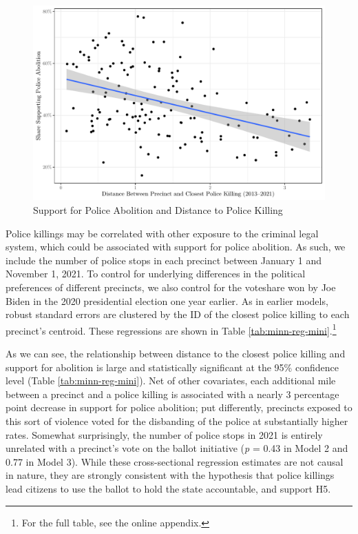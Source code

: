 \documentclass[12pt]{article}
\begin{document}
\begin{figure}[!ht]

\centering \includegraphics[width=\linewidth]{Figures/minn-scatter-1} 

\caption{\label{fig:minn-scatter}Support for Police Abolition and Distance to Police Killing}
\end{figure}

Police killings may be correlated with other exposure to the criminal legal system, which could be associated with support for police abolition. As such, we include the number of police stops in each precinct between January 1 and November 1, 2021. To control for underlying differences in the political preferences of different precincts, we also control for the voteshare won by Joe Biden in the 2020 presidential election one year earlier. As in earlier models, robust standard errors are clustered by the ID of the closest police killing to each precinct's centroid. These regressions are shown in Table \ref{tab:minn-reg-mini}.\footnote{For the full table, see the online appendix.} 



As we can see, the relationship between distance to the closest police killing and support for abolition is large and statistically significant at the 95\% confidence level (Table \ref{tab:minn-reg-mini}). Net of other covariates, each additional mile between a precinct and a police killing is associated with a nearly 3 percentage point decrease in support for police abolition; put differently, precincts exposed to this sort of violence voted for the disbanding of the police at substantially higher rates. Somewhat surprisingly, the number of police stops in 2021 is entirely unrelated with a precinct's vote on the ballot initiative (\textit{p} = 0.43 in Model 2 and 0.77 in Model 3). While these cross-sectional regression estimates are not causal in nature, they are strongly consistent with the hypothesis that police killings lead citizens to use the ballot to hold the state accountable, and support H5.
\end{document}
